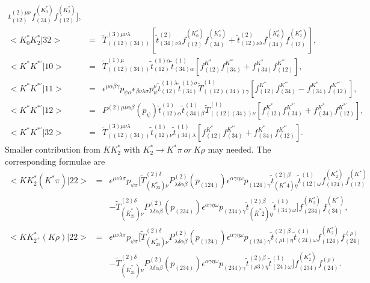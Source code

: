 \begin{eqnarray}
t^{(2)\mu\nu}_{(12)}f^{(K^*_0)}_{(34)}f^{(K^*_2)}_{(12)}],\\
<K^*_0K^*_2|32> \!&=&\! \tilde T^{(3)\mu\nu\lambda}_{((12)(34))}
[\tilde t^{(2)}_{(34)\nu\lambda}
f^{(K^*_0)}_{(12)}f^{(K^*_2)}_{(34)} + \tilde
t^{(2)}_{(12)\nu\lambda}f^{(K^*_0)}_{(34)}
f^{(K^*_2)}_{(12)}],\\
<K^*K^{*'}|10> \!&=&\! \tilde T^{(1)\mu}_{((12)(34))} \tilde
t^{(1)\alpha}_{(12)} \tilde t^{(1)}_{(34)\alpha}
[f_{(12)}^{K^*}f_{(34)}^{K^{*'}} +
f_{(34)}^{K^*}f_{(12)}^{K^{*'}}],\\
<K^*K^{*'}|11> \!&=&\! \epsilon^{\mu\alpha\beta\gamma}
p_{\psi\alpha}\epsilon_{\beta\nu\lambda\sigma}p_\psi^\nu \tilde
t^{(1)\lambda}_{(12)} \tilde t^{(1)\sigma}_{(34)} \tilde
T^{(1)}_{((12)(34))\gamma} [f_{(12)}^{K^*}f_{(34)}^{K^{*'}} -
f_{(34)}^{K^*}f_{(12)}^{K^{*'}}],\\
<K^*K^{*'}|12> \!&=&\! P^{(2)\mu\nu\alpha\beta} (p_\psi)\tilde
t^{(1)}_{(12)\alpha} \tilde t^{(1)}_{(34)\beta} \tilde
T^{(1)}_{((12)(34))\nu} [f_{(12)}^{K^*}f_{(34)}^{K^{*'}} +
f_{(34)}^{K^*}f_{(12)}^{K^{*'}}],\\
<K^*K^{*'}|32> \!&=&\! \tilde
T^{(3)\mu\nu\lambda}_{((12)(34))}\tilde t^{(1)}_{(12)\nu} \tilde
t^{(1)}_{(34)\lambda}[f_{(12)}^{K^*}f_{(34)}^{K^{*'}} +
f_{(34)}^{K^*}f_{(12)}^{K^{*'}}].
\end{eqnarray}
Smaller contribution from $KK^*_2$ with $K^*_2\to K^*\pi~or~K\rho$
may needed. The corresponding formulae are
\begin{eqnarray}
<KK^*_2(K^*\pi)|22> \!&=&\! \epsilon^{\mu\nu\lambda\sigma}
p_{\psi\sigma} [\tilde T^{(2)\delta}_{(K^*_23)\nu}
P^{(2)}_{\lambda\delta\alpha\beta}(p_{(124)})
\epsilon^{\alpha\gamma\eta\omega}p_{(124)\gamma} \tilde
t^{(2)\beta}_{(K^*4)\eta} \tilde
t^{(1)}_{(12)\omega}f^{(K^*_2)}_{(124)}f^{(K^*)}_{(12)}
\nonumber\\ & &  - \tilde T^{(2)\delta}_{(\bar K^*_21)\nu}
P^{(2)}_{\lambda\delta\alpha\beta}(p_{(234)})
\epsilon^{\alpha\gamma\eta\omega}p_{(234)\gamma} \tilde
t^{(2)\beta}_{(\bar K^*2)\eta} \tilde
t^{(1)}_{(34)\omega}]f^{(K^*_2)}_{(234)}f^{(K^*)}_{(34)},
\\
<KK^*_{2^+}(K\rho)|22> \!&=&\! \epsilon^{\mu\nu\lambda\sigma}
p_{\psi\sigma} [\tilde T^{(2)\delta}_{(K^*_23)\nu}
P^{(2)}_{\lambda\delta\alpha\beta}(p_{(124)})
\epsilon^{\alpha\gamma\eta\omega}p_{(124)\gamma} \tilde
t^{(2)\beta}_{(\rho 1)\eta} \tilde t^{(1)}_{(24)\omega}
f^{(K^*_2)}_{(124)}f^{(\rho)}_{(24)} \nonumber\\
& &  - \tilde T^{(2)\delta}_{(\bar K^*_21)\nu}
P^{(2)}_{\lambda\delta\alpha\beta}(p_{(234)})
\epsilon^{\alpha\gamma\eta\omega}p_{(234)\gamma} \tilde
t^{(2)\beta}_{(\rho 3)\eta} \tilde t^{(1)}_{(24)\omega}]
f^{(K^*_2)}_{(234)}f^{(\rho)}_{(24)}.
\end{eqnarray}
